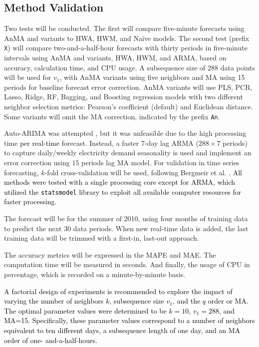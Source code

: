 \documentclass[journal, twoside]{IEEEtran}
\begin{document}
\subsection{Method Validation}
\label{sec:Validation}
Two tests will be conducted. The first will compare five-minute forecasts using \ac{AnMA} and variants to \ac{HWA}, \ac{HWM}, and Naïve models. The second test (prefix \texttt{X}) will compare two-and-a-half-hour forecasts with thirty periods in five-minute intervals using \ac{AnMA} and variants, \ac{HWA}, \ac{HWM}, and \ac{ARMA}, based on accuracy, calculation time, and CPU usage. A subsequence size of 288 data points will be used for $v_1$, with \ac{AnMA} variants using five neighbors and MA using 15 periods for baseline forecast error correction. \ac{AnMA} variants will use \ac{PLS}, \ac{PCR}, Lasso, Ridge, \ac{RF}, Bagging, and Boosting regression models with two different neighbor selection metrics: Pearson's coefficient (default) and Euclidean distance. Some variants will omit the MA correction, indicated by the prefix \texttt{An}. %

Auto-ARIMA was attempted \cite{Hyndman2008,garza2022statsforecast}, but %
it was unfeasible due to the high processing time \textcolor{black}{per real-time}
forecast. Instead, a faster 7-day lag \ac{ARMA} ($288 \times 7$ periods) to capture daily/weekly electricity demand seasonality is used 
\cite{Alysha2011} and implement an error correction using $15$ periods lag MA model. For validation in time series
forecasting, $k$-fold cross-validation will be used, following
Bergmeir et al. \cite{Bergmeir2018}. 
\textcolor{black}{All methods were tested with a single processing core except for ARMA, which utilized the \texttt{statsmodel} \cite{seabold2010statsmodels} library to exploit all available computer resources for faster processing.}

The forecast will be for the summer of 2010, using four months of training data to predict the next 30 data periods. When new real-time data is added, the last training data will be trimmed with a first-in, last-out approach. 

The accuracy metrics will be expressed in the \ac{MAPE} and \ac{MAE}. The computation time will be measured in seconds. And finally, the usage of CPU in percentage, which is recorded on a minute-by-minute basis.

\textcolor{black}{A factorial design of experiments is recommended to explore the impact of varying the number of neighbors $k$, subsequence size $v_1$, and the $q$ order or MA. The optimal parameter values were determined to be $k=10$, $v_1=288$, and MA=15. Specifically, these parameter values correspond to a number of neighbors equivalent to ten different days, a subsequence length of one day, and an MA order of one- and-a-half-hours.}
\end{document}

